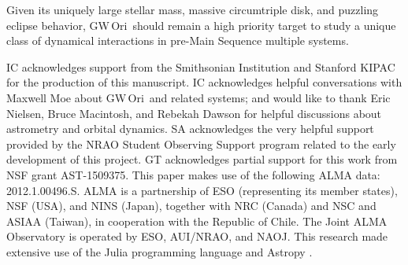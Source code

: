 \documentclass[twocolumn]{aastex61}
\newcommand{\obj}{GW\,Ori}
\begin{document}
Given its uniquely large stellar mass, massive circumtriple disk, and puzzling eclipse behavior, \obj\ should remain a high priority target to study a unique class of dynamical interactions in pre-Main Sequence multiple systems.

\acknowledgments
IC acknowledges support from the Smithsonian Institution and Stanford KIPAC for the production of this manuscript. IC acknowledges helpful conversations with Maxwell Moe about \obj\ and related systems; and would like to thank Eric Nielsen, Bruce Macintosh, and Rebekah Dawson for helpful discussions about astrometry and orbital dynamics. SA acknowledges the very helpful support provided by the NRAO Student Observing Support program related to the early development of this project. GT acknowledges partial support for this work from NSF grant AST-1509375. This paper makes use of the following ALMA data: 2012.1.00496.S. ALMA is a partnership of ESO (representing its member states), NSF (USA), and NINS (Japan), together with NRC (Canada) and NSC and ASIAA (Taiwan), in cooperation with the Republic of Chile.  The Joint ALMA Observatory is operated by ESO, AUI/NRAO, and NAOJ.  This research made extensive use of the Julia programming language \citep{bezanson17} and Astropy \citep{astropy13}.




\end{document}
